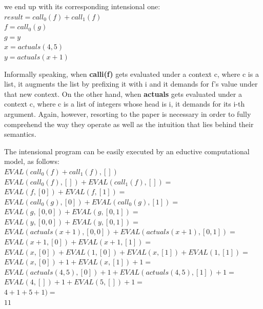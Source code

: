 \documentclass[ack,preface]{dithesis}
\begin{document}
\begin{flushleft}
we end up with its corresponding intensional one:\\
 \setlength{\parindent}{25ex} $result = call_0(f) + call_1(f)$ \\
$f = call_0(g)$ \\ 
$g = y$ \\
$x = actuals(4,5)$ \\
$y = actuals(x+1)$ \\
\end{flushleft}

Informally speaking, when \textbf{calli(f)} gets evaluated under a context c, where c is  a list, it augments the list by prefixing it with i and it demands for f's value under that new context.  On the other hand, when \textbf{actuals} gets evaluated under a context c, where c is a list of  integers whose head is i, it demands for  its  i-th argument. Again, however, resorting to the paper is necessary in order to fully comprehend the way they operate as well as the intuition that lies behind their semantics.

\begin{flushleft}
The intensional program can be easily executed by an eductive computational model, as follows:\\
 \setlength{\parindent}{15ex} $EVAL(call_0(f)+call_1(f), [])$ \\
$EVAL(call_0(f), []) + EVAL(call_1(f), []) =$ \\ 
$EVAL(f, [0]) + EVAL(f, [1]) =$ \\ 
$EVAL(call_0(g), [0]) + EVAL(call_0(g), [1]) =$ \\ 
$EVAL(g, [0,0]) + EVAL(g, [0,1]) =$ \\ 
$EVAL(y, [0,0]) + EVAL(y, [0,1]) =$ \\ 
$EVAL(actuals(x+1), [0,0]) + EVAL(actuals(x+1), [0,1]) =$ \\ 
$EVAL(x+1, [0]) + EVAL(x+1, [1]) =$ \\ 
$EVAL(x, [0]) + EVAL(1, [0]) + EVAL(x, [1]) + EVAL(1, [1]) =$ \\ 
$EVAL(x, [0]) + 1 + EVAL(x, [1]) + 1 =$ \\
$EVAL(actuals(4,5), [0]) + 1 + EVAL(actuals(4,5), [1]) + 1 =$ \\
$EVAL(4, []) + 1 + EVAL(5, []) + 1 =$ \\
$4+1+5+ 1) =$ \\
$11$ \\
\end{flushleft}
\end{document}

